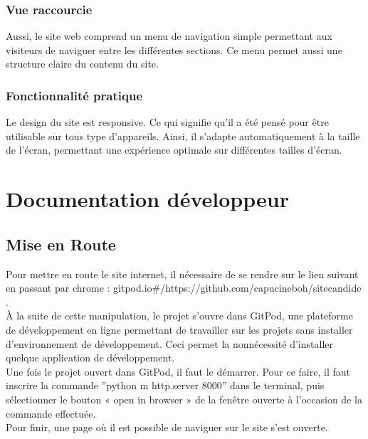 \documentclass[a4,10pt,french]{sphinxmanual}
\begin{document}
\subsection{Vue raccourcie}
\label{\detokenize{chapitre-01:vue-raccourcie}}
\sphinxAtStartPar
Aussi, le site web comprend un menu de navigation simple permettant aux visiteurs de naviguer entre les différentes sections. Ce menu permet aussi une structure claire du contenu du site.


\subsection{Fonctionnalité pratique}
\label{\detokenize{chapitre-01:fonctionnalite-pratique}}
\sphinxAtStartPar
Le design du site est responsive. Ce qui signifie qu’il a été pensé pour être utilisable sur tous type d’appareils. Ainsi, il s’adapte automatiquement à la taille de l’écran, permettant une expérience optimale sur différentes tailles d’écran.


\chapter{Documentation développeur}
\label{\detokenize{chapitre-02:documentation-developpeur}}\label{\detokenize{chapitre-02::doc}}

\section{Mise en Route}
\label{\detokenize{chapitre-02:mise-en-route}}
\sphinxAtStartPar
Pour mettre en route le site internet, il nécessaire de se rendre sur le lien suivant en passant par chrome : gitpod.io\#/https://github.com/capucineboh/site\sphinxhyphen{}candide .\\
À la suite de cette manipulation, le projet s’ouvre dans GitPod, une plateforme de développement en ligne permettant de travailler sur les projets sans installer d’environnement de développement. Ceci permet la non\sphinxhyphen{}nécessité d’installer quelque application de développement.\\
Une fois le projet ouvert dans GitPod, il faut le démarrer. Pour ce faire, il faut inscrire la commande ”python \sphinxhyphen{}m http.server 8000” dans le terminal, puis sélectionner le bouton « open in browser » de la fenêtre ouverte à l’occasion de la commande effectuée.\\
Pour finir, une page où il est possible de naviguer sur le site s’est ouverte.
\end{document}
